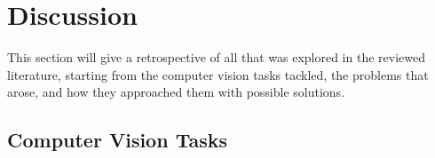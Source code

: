 \graphicspath{{content/chapters/literature_review/discussion/figures}}

\section{Discussion}
\label{sec:literature_review_discussion}

This section will give a retrospective of all that was explored in the reviewed literature, starting from the computer vision tasks tackled, the problems that arose, and how they approached them with possible solutions.

\subsection{Computer Vision Tasks}
\label{subsec:discussion_computer_vision_tasks}

